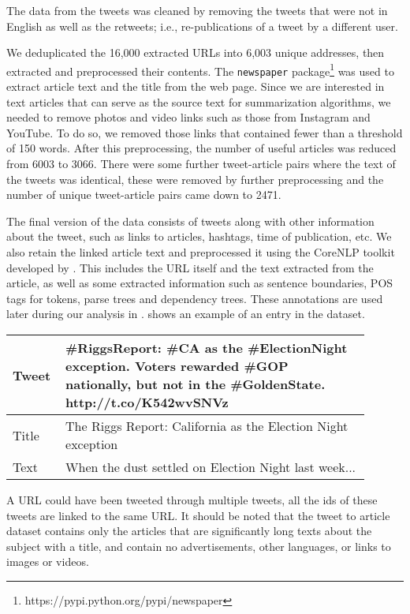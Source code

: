 The data from the tweets was cleaned by removing the tweets that were not in English as well as the retweets; i.e., re-publications of a tweet by a different user.

We deduplicated the 16,000 extracted URLs into 6,003 unique addresses, then extracted and preprocessed their contents. The \texttt{newspaper} package\footnote{https://pypi.python.org/pypi/newspaper} was used to extract article text and the title from the web page. Since we are interested in text articles that can serve as the source text for summarization algorithms, we needed to remove photos and video links such as those from Instagram and YouTube. To do so, we removed those links that contained fewer than a threshold of 150 words. After this preprocessing, the number of useful articles was reduced from 6003 to 3066. There were some further tweet-article pairs where the text of the tweets was identical, these were removed by further preprocessing and the number of unique tweet-article pairs came down to 2471. 

The final version of the data consists of tweets along with other information about the tweet, such as links to articles, hashtags, time of publication, etc. We also retain the linked article text and preprocessed it using the CoreNLP toolkit developed by  \cite{manning2014stanford}. This includes the URL itself and the text extracted from the article, as well as some extracted information such as sentence boundaries, POS tags for tokens, parse trees and dependency trees. These annotations are used later during our analysis in .  shows an example of an entry in the dataset.

\begin{table}[!htbp]
\centering
\begin{tabular}{|p{0.1\linewidth}|p{0.8\linewidth}|}
\hline
Tweet & \#RiggsReport: \#CA as the \#ElectionNight exception. Voters rewarded \#GOP nationally, but not in the \#GoldenState. http://t.co/K542wvSNVz \\ \hline
Title & The Riggs Report: California as the Election Night exception                                                                                 \\ \hline
Text  & When the dust settled on Election Night last week...                                                                                         \\ \hline
\end{tabular}
\label{tab:ex1}
\end{table}

A URL could have been tweeted through multiple tweets, all the ids of these tweets are linked to the same URL. It should be noted that the tweet to article dataset contains only the articles that are significantly long texts about the subject with a title, and contain no advertisements, other languages, or links to images or videos. 



